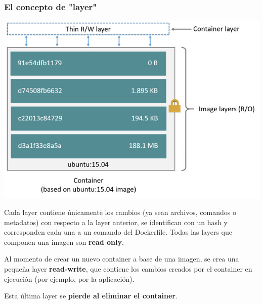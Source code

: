 \documentclass[xcolor={dvipsnames}]{beamer}
\begin{document}
\begin{frame}[fragile]
	\frametitle{El concepto de "layer"}
	\vspace{-0.8cm}
	\begin{multicols}{2}
	\justify
	\vspace*{\fill}
		\hspace{-0.5cm}
		\includegraphics[height=.5\textheight]{assets/layers2.jpg}
	\vspace*{\fill}
	\columnbreak
	\vspace*{\fill}
		\begin{spacing}{0.8}
		\small Cada layer contiene únicamente los cambios (ya sean archivos, comandos o metadatos) con respecto a la layer anterior, se identifican con un hash y corresponden cada una a un comando del Dockerfile. Todas las layers que componen una imagen son \textbf{read only}.

		\vspace{0.25cm}

		\small Al momento de crear un nuevo container a base de una imagen, se crea una pequeña layer \textbf{read-write}, que contiene los cambios creados por el container en ejecución (por ejemplo, por la aplicación).

		\vspace{0.25cm}

		\small Esta última layer se \textbf{pierde al eliminar el container}.
			\end{spacing}
	\vspace*{\fill}
	\end{multicols}
\end{frame}
\end{document}
